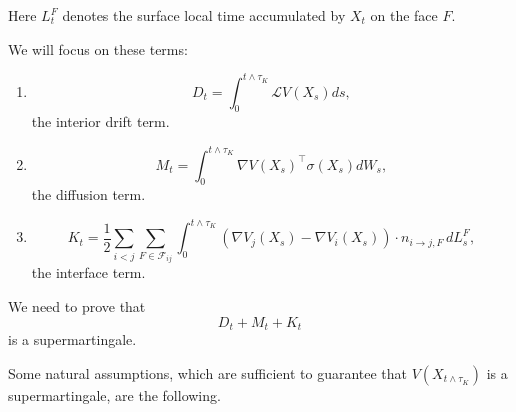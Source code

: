 Here $L_t^F$ denotes the surface local time accumulated by $X_t$ on the face
$F$.

We will focus on these terms:

\begin{enumerate}
\item
\[
D_t
=
\int_0^{t \wedge \tau_K}
\mathcal{L}V(X_s)ds,
\]
the interior drift term.

\item
\[
    M_t
    =
    \int_0^{t \wedge \tau_K}
    \nabla V(X_s)^\top \sigma(X_s)dW_s,
\]
the diffusion term.

\item
\[
    K_t
    =
    \frac{1}{2}
    \sum_{i<j}
    \sum_{F\in\mathcal F_{ij}}
    \int_0^{t \wedge \tau_K}
    \left(
        \nabla V_j(X_s) - \nabla V_i(X_s)
    \right)\cdot n_{i\to j,F}\,
    dL_s^F,
\]
the interface term.
\end{enumerate}

We need to prove that
\[
D_t + M_t + K_t
\]
is a supermartingale.

Some natural assumptions, which are sufficient to guarantee that
$V(X_{t \wedge \tau_K})$ is a supermartingale, are the following.

